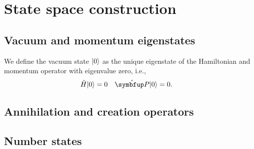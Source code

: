 \section{State space construction}

\subsection{Vacuum and momentum eigenstates}

We define the vacuum state $\lvert0\rangle$ as the unique eigenstate of the Hamiltonian and momentum operator with eigenvalue zero, i.e.,
\begin{align}
	\hat{H}
	\ket{0}
	&=
	0
	&
	\vu{P}
	\ket{0}
	&=
	0
	.
\end{align}

\subsection{Annihilation and creation operators}

\subsection{Number states}